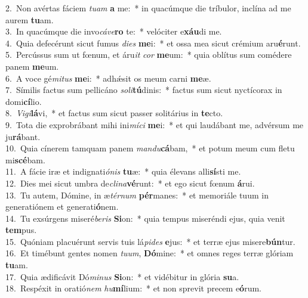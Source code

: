 {2.~}Non avértas fáciem \textit{tu}\textit{am} \textbf{a} me:~* in quacúmque die tríbulor, inclína ad me aurem \textbf{tu}am.\\
{3.~}In quacúmque die invo\textit{cá}\textit{ve}\textbf{ro} te:~* velóciter e\textbf{xáu}di me.\\
{4.~}Quia defecérunt sicut fumus \textit{di}\textit{es} \textbf{me}i:~* et ossa mea sicut crémium aru\textbf{é}runt.\\
{5.~}Percússus sum ut fœnum, et áru\textit{it} \textit{cor} \textbf{me}um:~* quia oblítus sum comédere panem \textbf{me}um.\\
{6.~}A voce gé\textit{mi}\textit{tus} \textbf{me}i:~* adhǽsit os meum carni \textbf{me}æ.\\
{7.~}Símilis factus sum pellicáno \textit{so}\textit{li}\textbf{tú}dinis:~* factus sum sicut nyctícorax in domi\textbf{cí}lio.\\
{8.~}\textit{Vi}\textit{gi}\textbf{lá}vi,~* et factus sum sicut passer solitárius in \textbf{te}cto.\\
{9.~}Tota die exprobrábant mihi ini\textit{mí}\textit{ci} \textbf{me}i:~* et qui laudábant me, advérsum me ju\textbf{rá}bant.\\
{10.~}Quia cínerem tamquam panem \textit{man}\textit{du}\textbf{cá}bam,~* et potum meum cum fletu mi\textbf{scé}bam.\\
{11.~}A fácie iræ et indignati\textit{ó}\textit{nis} \textbf{tu}æ:~* quia élevans alli\textbf{sí}sti me.\\
{12.~}Dies mei sicut umbra de\textit{cli}\textit{na}\textbf{vé}runt:~* et ego sicut fœnum \textbf{á}rui.\\
{13.~}Tu autem, Dómine, in æ\textit{tér}\textit{num} \textbf{pér}manes:~* et memoriále tuum in generatiónem et generati\textbf{ó}nem.\\
{14.~}Tu exsúrgens miseré\textit{be}\textit{ris} \textbf{Si}on:~* quia tempus miseréndi ejus, quia venit \textbf{tem}pus.\\
{15.~}Quóniam placuérunt servis tuis lá\textit{pi}\textit{des} \textbf{e}jus:~* et terræ ejus misere\textbf{bún}tur.\\
{16.~}Et timébunt gentes nomen \textit{tu}\textit{um}, \textbf{Dó}mine:~* et omnes reges terræ glóriam \textbf{tu}am.\\
{17.~}Quia ædificávit Dó\textit{mi}\textit{nus} \textbf{Si}on:~* et vidébitur in glória \textbf{su}a.\\
{18.~}Respéxit in oratió\textit{nem} \textit{hu}\textbf{mí}lium:~* et non sprevit precem e\textbf{ó}rum.\\
